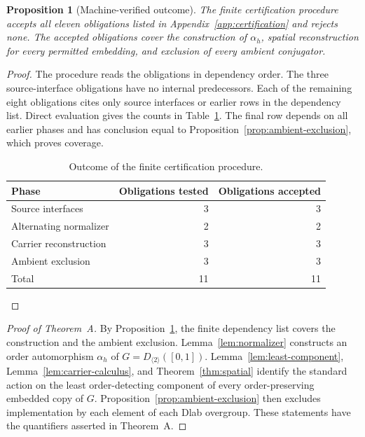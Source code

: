 \documentclass[11pt]{amsart}
\newtheorem{proposition}[theorem]{Proposition}
\theoremstyle{definition}
\theoremstyle{remark}
\numberwithin{equation}{section}
\begin{document}
\begin{proposition}[Machine-verified outcome]
\label{prop:machine}
The finite certification procedure accepts all eleven obligations listed in Appendix~\ref{app:certification} and rejects none. The accepted obligations cover the construction of \(\alpha_h\), spatial reconstruction for every permitted embedding, and exclusion of every ambient conjugator.
\end{proposition}

\begin{proof}
The procedure reads the obligations in dependency order. The three source-interface obligations have no internal predecessors. Each of the remaining eight obligations cites only source interfaces or earlier rows in the dependency list. Direct evaluation gives the counts in Table~\ref{tab:counts}. The final row depends on all earlier phases and has conclusion equal to Proposition~\ref{prop:ambient-exclusion}, which proves coverage.

\begin{table}[t]
\centering
\small
\caption{Outcome of the finite certification procedure.}
\label{tab:counts}
\begin{tabular}{@{}lrr@{}}
\toprule
Phase & Obligations tested & Obligations accepted \\
\midrule
Source interfaces & 3 & 3 \\
Alternating normalizer & 2 & 2 \\
Carrier reconstruction & 3 & 3 \\
Ambient exclusion & 3 & 3 \\
\midrule
Total & 11 & 11 \\
\bottomrule
\end{tabular}
\end{table}
\end{proof}

\begin{proof}[Proof of Theorem~A]
By Proposition~\ref{prop:machine}, the finite dependency list covers the construction and the ambient exclusion. Lemma~\ref{lem:normalizer} constructs an order automorphism \(\alpha_h\) of \(G=D_{\langle2\rangle}([0,1])\). Lemma~\ref{lem:least-component}, Lemma~\ref{lem:carrier-calculus}, and Theorem~\ref{thm:spatial} identify the standard action on the least order-detecting component of every order-preserving embedded copy of \(G\). Proposition~\ref{prop:ambient-exclusion} then excludes implementation by each element of each Dlab overgroup. These statements have the quantifiers asserted in Theorem~A.
\end{proof}
\end{document}
